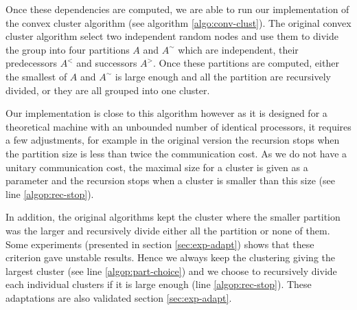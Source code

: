 \documentclass[10pt, conference, compsocconf,pdftex,dvipsnames]{IEEEtran}
\begin{document}
Once these dependencies are computed, we are able to run our implementation of
the convex cluster algorithm (see algorithm \ref{algo:conv-clust}). The
original convex cluster algorithm select two independent random nodes and use
them to divide the group into four partitions $A$ and $A^{\sim}$ which are
independent, their predecessors $A^<$ and successors $A^>$. Once these
partitions are computed, either the smallest of $A$ and $A^{\sim}$ is large
enough and all the partition are recursively divided, or they are all grouped
into one cluster. 

Our implementation is close to this algorithm however as it is designed for a
theoretical machine with an unbounded number of identical processors, it
requires a few adjustments, for example in the original version the recursion
stops when the partition size is less than twice the communication cost. As we
do not have a unitary communication cost, the maximal size for a cluster is
given as a parameter and the recursion stops when a cluster is smaller than
this size (see line \ref{algop:rec-stop}). 

In addition, the original algorithms kept the cluster where the smaller
partition was the larger and recursively divide either all the partition or
none of them. Some experiments (presented in section \ref{sec:exp-adapt})
shows that these criterion gave unstable results. Hence we always keep the
clustering giving the largest cluster (see line \ref{algop:part-choice}) and
we choose to recursively divide each individual clusters if it is large enough
(line \ref{algop:rec-stop}). These adaptations are also validated section
\ref{sec:exp-adapt}.
\end{document}
